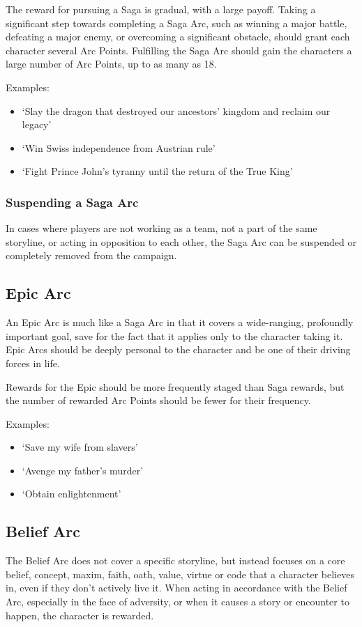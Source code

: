 \documentclass[oneside,11pt,english]{book}
\begin{document}
The reward for pursuing a Saga is gradual, with a large payoff. Taking a
significant step towards completing a Saga Arc, such as winning a major battle,
defeating a major enemy, or overcoming a significant obstacle, should grant each
character several Arc Points. Fulfilling the Saga Arc should gain the characters
a large number of Arc Points, up to as many as 18.  


Examples:
\begin{itemize}
\item ‘Slay the dragon that destroyed our ancestors’ kingdom and reclaim our legacy’ 
\item ‘Win Swiss independence from Austrian rule’ 
\item ‘Fight Prince John’s tyranny until the return of the True King’ 
\end{itemize} 

\subsubsection{Suspending a Saga Arc}
In cases where players are not working as a team, not a part of the same storyline, or acting in opposition 
to each other, the Saga Arc can be suspended or completely removed from the campaign. 

\subsection{Epic Arc} 
An Epic Arc is much like a Saga Arc in that it covers a wide-ranging, profoundly important goal, save for 
the fact that it applies only to the character taking it. Epic Arcs should be deeply personal to the character 
and be one of their driving forces in life. 


Rewards for the Epic should be more frequently staged than Saga rewards, but the number of rewarded 
Arc Points should be fewer for their frequency. 



Examples: 
\begin{itemize}
\item ‘Save my wife from slavers’ 
\item ‘Avenge my father’s murder’ 
\item ‘Obtain enlightenment’ 
\end{itemize}


\subsection{Belief Arc}
The Belief Arc does not cover a specific storyline, but instead focuses on a core belief, concept, maxim, 
faith, oath, value, virtue or code that a character believes in, even if they don’t actively live it. When 
acting in accordance with the Belief Arc, especially in the face of adversity, or when it causes a story or 
encounter to happen, the character is rewarded. 
\end{document}

